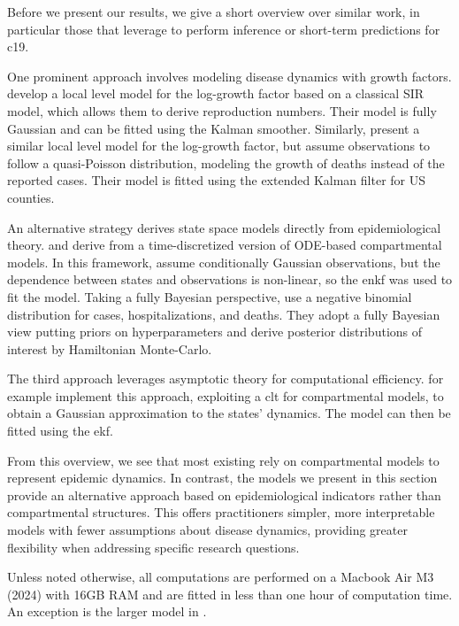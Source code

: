 Before we present our results, we give a short overview over similar work, in particular those that leverage  to perform inference or short-term predictions for \acrshort{c19}.

One prominent approach involves modeling disease dynamics with growth factors. \citep{Arroyo-Marioli2021Tracking} develop a local level model for the log-growth factor based on a classical SIR model, which allows them to derive reproduction numbers. Their model is fully Gaussian and can be fitted using the Kalman smoother. Similarly, \citep{Ives2021Estimating} present a similar local level model for the log-growth factor, but assume observations to follow a quasi-Poisson distribution, modeling the growth of deaths instead of the reported cases. Their model is fitted using the extended Kalman filter for US counties.

An alternative strategy derives state space models directly from epidemiological theory. \citep{Lal2021Application} and \citep{Keller2022Tracking} derive  from a time-discretized version of ODE-based compartmental models. In this framework, \citep{Lal2021Application} assume conditionally Gaussian observations, but the dependence between states and observations is non-linear, so the \acrshort{enkf} was used to fit the model. Taking a fully Bayesian perspective, \citep{Keller2022Tracking} use a negative binomial distribution for cases, hospitalizations, and deaths. They adopt a fully Bayesian view putting priors on hyperparameters and derive posterior distributions of interest by Hamiltonian Monte-Carlo.

The third approach leverages asymptotic theory for computational efficiency. \citep{ODea2022Semiparametric} for example implement this approach, exploiting a \acrshort{clt} for compartmental models, to obtain a Gaussian approximation to the states' dynamics. The model can then be fitted using the \acrshort{ekf}.

From this overview, we see that most existing  rely on compartmental models to represent epidemic dynamics. In contrast, the models we present in this section provide an alternative approach based on epidemiological indicators rather than compartmental structures. This offers practitioners simpler, more interpretable models with fewer assumptions about disease dynamics, providing greater flexibility when addressing specific research questions.

Unless noted otherwise, all computations are performed on a Macbook Air M3 (2024) with 16GB RAM and are fitted in less than one hour of computation time.  An exception is the larger model in .



